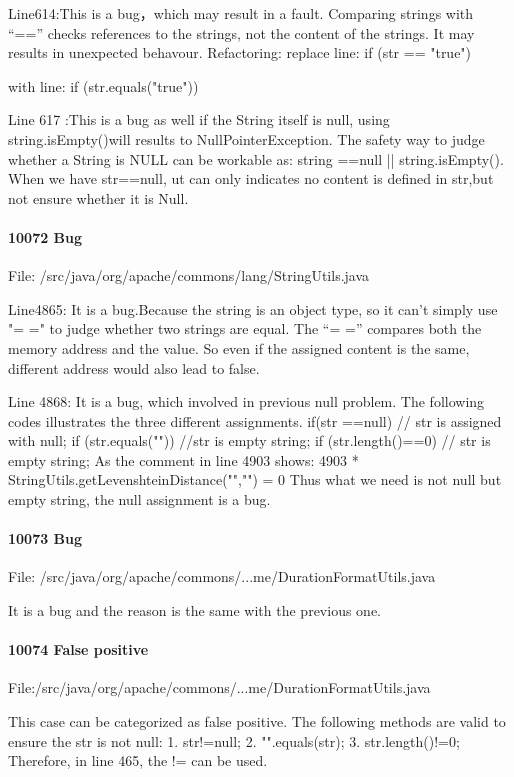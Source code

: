 \documentclass[12pt]{article}
\begin{document}
Line614:This is a bug，which  may  result  in  a  fault.  Comparing  strings  with  “==”  checks   references  to  the  strings,  not  the  content  of  the  strings.  It may results in unexpected behavour. Refactoring: replace  line:  if  (str ==  "true")  {    with  line:  if  (str.equals("true"))  {
Line 617 :This is a bug as well if the String itself is null, using string.isEmpty()will results to NullPointerException. The safety way to judge whether a String is NULL can be workable as: string ==null || string.isEmpty().  When we have str==null, ut can only indicates no content is defined in str,but not ensure whether it is Null. 


\paragraph{10072 Bug}
File: /src/java/org/apache/commons/lang/StringUtils.java

Line4865: It is a bug.Because the string is an object type, so it can't simply use "= =" to judge whether two strings are equal. The “= =” compares both the memory address and the value. So even if the assigned content is the same, different address would also lead to false. 

Line 4868: It is a bug, which involved in previous null problem. The following codes illustrates the three different assignments.
if(str ==null)   
  {   
    // str is assigned with null;   
  }   
  if   (str.equals(""))   
  {   
  //str is empty string;   
  }   
  if   (str.length()==0)   
  {   
  // str is empty string;   
  }   
As the comment in line 4903 shows:
4903     * StringUtils.getLevenshteinDistance("","")               = 0
Thus what we need is not null but empty string, the null assignment is a bug.

\paragraph{10073 Bug}
File: /src/java/org/apache/commons/...me/DurationFormatUtils.java

It is a bug and the reason is the same with the previous one.

\paragraph{10074 False positive}
File:/src/java/org/apache/commons/...me/DurationFormatUtils.java

This case can be categorized as false positive.
The following methods are valid to ensure the str is not null:
  1. str!=null;
  2. "".equals(str);
  3. str.length()!=0;
Therefore, in line 465, the != can be used.

}}
\end{document}
